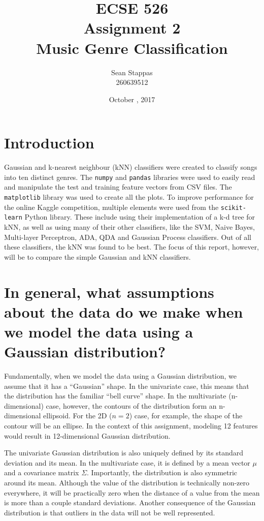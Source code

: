\documentclass[a4paper,titlepage]{article}
\title{
	\textbf{ECSE 526 \\ Assignment 2}
	\\ \large Music Genre Classification
}
\author{Sean Stappas \\ 260639512}
\date{October \nth{19}, 2017}
\begin{document}
	\sloppy
	\maketitle
	\twocolumn
	
	\section*{Introduction}
	
	Gaussian and k-nearest neighbour (kNN) classifiers were created to classify songs into ten distinct genres. The \texttt{numpy} and \texttt{pandas} libraries were used to easily read and manipulate the test and training feature vectors from CSV files. The \texttt{matplotlib} library was used to create all the plots. To improve performance for the online Kaggle competition, multiple elements were used from the \texttt{scikit-learn} Python library. These include using their implementation of a k-d tree for kNN, as well as using many of their other classifiers, like the SVM, Naive Bayes, Multi-layer Perceptron, ADA, QDA and Gaussian Process classifiers. Out of all these classifiers, the kNN was found to be best. The focus of this report, however, will be to compare the simple Gaussian and kNN classifiers.
	
	\section{In general, what assumptions about the data do we make when we model the data using a Gaussian distribution?}
	
	Fundamentally, when we model the data using a Gaussian distribution, we assume that it has a ``Gaussian'' shape. In the univariate case, this means that the distribution has the familiar ``bell curve'' shape. In the multivariate (n-dimensional) case, however, the contours of the distribution form an n-dimensional ellipsoid. For the 2D ($n=2$) case, for example, the shape of the contour will be an ellipse. In the context of this assignment, modeling 12 features would result in 12-dimensional Gaussian distribution.
	
	The univariate Gaussian distribution is also uniquely defined by its standard deviation and its mean. In the multivariate case, it is defined by a mean vector $\mu$ and a covariance matrix $\Sigma$. Importantly, the distribution is also symmetric around its mean. Although the value of the distribution is technically non-zero everywhere, it will be practically zero when the distance of a value from the mean is more than a couple standard deviations. Another consequence of the Gaussian distribution is that outliers in the data will not be well represented.
	
\end{document}
